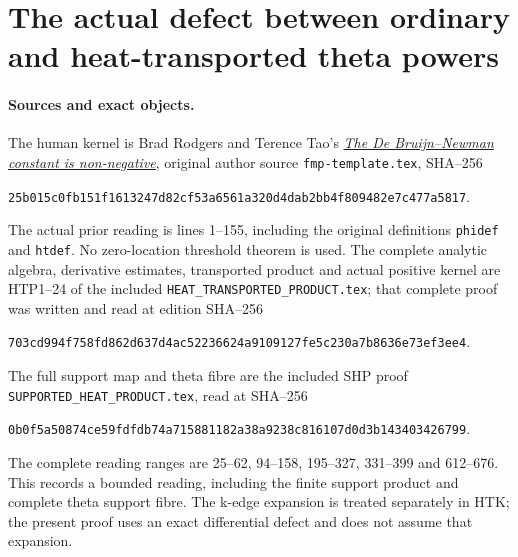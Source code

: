 \section{The actual defect between ordinary and heat-transported theta powers}
\label{sec:heat-amplification-defect}

\paragraph{Sources and exact objects.}
The human kernel is Brad Rodgers and Terence Tao's
\href{https://arxiv.org/abs/1801.05914v5}{\emph{The De Bruijn--Newman
constant is non-negative}}, original author source
\nolinkurl{fmp-template.tex}, SHA--256
\begin{center}\small
\nolinkurl{25b015c0fb151f1613247d82cf53a6561a320d4dab2bb4f809482e7c477a5817}.
\end{center}
The actual prior reading is lines 1--155, including the original
definitions \texttt{phidef} and \texttt{htdef}. No zero-location
threshold theorem is used. The complete analytic algebra,
derivative estimates, transported product and actual positive
kernel are HTP1--24 of the included
\nolinkurl{HEAT_TRANSPORTED_PRODUCT.tex}; that complete proof was
written and read at edition SHA--256
\begin{center}\small
\nolinkurl{703cd994f758fd862d637d4ac52236624a9109127fe5c230a7b8636e73ef3ee4}.
\end{center}
The full support map and theta fibre are the included SHP
proof \nolinkurl{SUPPORTED_HEAT_PRODUCT.tex}, read at SHA--256
\begin{center}\small
\nolinkurl{0b0f5a50874ce59fdfdb74a715881182a38a9238c816107d0d3b143403426799}.
\end{center}
The complete reading ranges are 25--62, 94--158, 195--327,
331--399 and 612--676. This records a bounded reading, including
the finite support product and complete theta support fibre.
The k-edge expansion is treated separately in HTK; the present
proof uses an exact differential defect and does not assume that
expansion.


